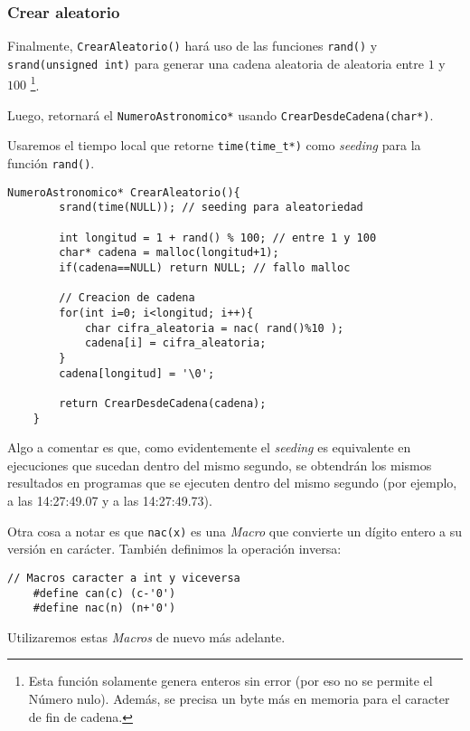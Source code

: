 \documentclass[a4paper, 12pt]{article}
\begin{document}
\subsubsection{Crear aleatorio}\label{crear-aleatorio}

Finalmente, \verb|CrearAleatorio()| hará uso de las funciones \verb|rand()| y \verb|srand(unsigned int)| para generar una cadena aleatoria de aleatoria entre $1$ y $100$ \footnote{Esta función solamente genera enteros sin error (por eso no se permite el Número nulo). Además, se precisa un byte más en memoria para el caracter de fin de cadena.}.

Luego, retornará el \verb|NumeroAstronomico*| usando \verb|CrearDesdeCadena(char*)|.

Usaremos el tiempo local que retorne \verb|time(time_t*)| como \emph{seeding} para la función \verb|rand()|.

\begin{lstlisting}[style=C]
    NumeroAstronomico* CrearAleatorio(){
        srand(time(NULL)); // seeding para aleatoriedad
    
        int longitud = 1 + rand() % 100; // entre 1 y 100
        char* cadena = malloc(longitud+1);
        if(cadena==NULL) return NULL; // fallo malloc
    
        // Creacion de cadena
        for(int i=0; i<longitud; i++){
            char cifra_aleatoria = nac( rand()%10 );
            cadena[i] = cifra_aleatoria;
        }
        cadena[longitud] = '\0';
    
        return CrearDesdeCadena(cadena);
    }
\end{lstlisting}

Algo a comentar es que, como evidentemente el \emph{seeding} es equivalente en ejecuciones que sucedan dentro del mismo segundo, se obtendrán los mismos resultados en programas que se ejecuten dentro del mismo segundo (por ejemplo, a las 14:27:49.07 y a las 14:27:49.73).

Otra cosa a notar es que \verb|nac(x)| es una \emph{Macro} que convierte un dígito entero a su versión en carácter. También definimos la operación inversa:

\label{macros-can-nac}
\begin{lstlisting}[style=C]
    // Macros caracter a int y viceversa
    #define can(c) (c-'0')
    #define nac(n) (n+'0')
\end{lstlisting}

Utilizaremos estas \emph{Macros} de nuevo más adelante.
\end{document}
